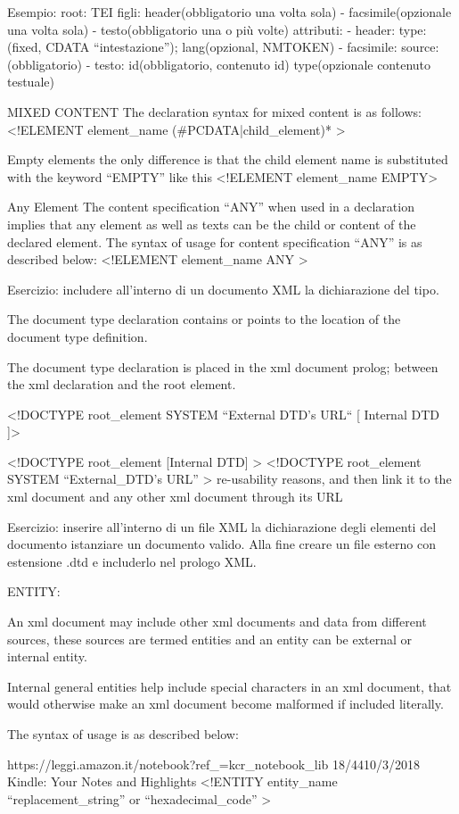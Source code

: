 Esempio:
root: TEI
figli: header(obbligatorio una volta sola) - facsimile(opzionale una volta sola) - testo(obbligatorio una o più volte)
attributi: 
- header: type:(fixed, CDATA ``intestazione''); lang(opzional, NMTOKEN)
- facsimile: source:(obbligatorio)
- testo: id(obbligatorio, contenuto id) type(opzionale contenuto testuale)

MIXED CONTENT
The declaration syntax for mixed content is as follows: <!ELEMENT
element_name (#PCDATA|child_element)* >

Empty elements 
the only difference is that the child element name is
substituted with the keyword “EMPTY” like this <!ELEMENT element_name
EMPTY>

Any Element
The content specification “ANY” when used in a declaration implies that any
element as well as texts can be the child or content of the declared element.
The syntax of usage for content specification “ANY” is as described below:
<!ELEMENT element_name ANY >

Esercizio: includere all'interno di un documento XML la dichiarazione del tipo.

The document type declaration contains or points to the location of the
document type definition.

The document type declaration is placed in the xml document prolog; between
the xml declaration and the root element.

<!DOCTYPE root_element SYSTEM “External DTD’s URL“ [
Internal DTD ]>

<!DOCTYPE root_element [Internal DTD] >
<!DOCTYPE root_element SYSTEM “External_DTD’s URL” >
re-usability reasons, and then link it to the xml document and any other xml
document through its URL

Esercizio: inserire all'interno di un file XML la dichiarazione degli elementi del documento istanziare un documento valido.
Alla fine creare un file esterno con estensione .dtd e includerlo nel prologo XML.


ENTITY:


An xml document may include other xml documents and data from different
sources, these sources are termed entities and an entity can be external or
internal entity.


Internal general entities help include special characters in an xml document,
that would otherwise make an xml document become malformed if included
literally.


The syntax of usage is as described below:


https://leggi.amazon.it/notebook?ref_=kcr_notebook_lib
18/4410/3/2018
Kindle: Your Notes and Highlights
<!ENTITY entity_name “replacement_string” or “hexadecimal_code” >



